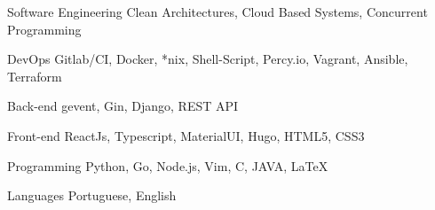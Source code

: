 

\begin{cvskills}

  \cvskill
    {Software Engineering} %
    {Clean Architectures, Cloud Based Systems, Concurrent Programming} %

  \cvskill
    {DevOps} %
    {Gitlab/CI, Docker, *nix, Shell-Script, Percy.io, Vagrant, Ansible, Terraform} %

  \cvskill
    {Back-end} %
    {gevent, Gin, Django, REST API} %

  \cvskill
    {Front-end} %
    {ReactJs, Typescript, MaterialUI, Hugo, HTML5, CSS3} %

  \cvskill
    {Programming} %
    {Python, Go, Node.js, Vim, C, JAVA, LaTeX} %

  \cvskill
    {Languages} %
    {Portuguese, English} %

\end{cvskills}
